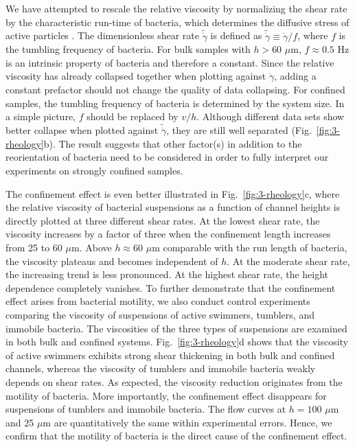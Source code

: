We have attempted to rescale the relative viscosity by normalizing the shear rate by the characteristic run-time of
bacteria, which determines the diffusive stress of active particles \cite{Takatori2017}. The dimensionless shear rate $\tilde{\dot\gamma}$ is defined as $\tilde{\dot\gamma}\equiv \dot\gamma / f$, where $f$ is the tumbling frequency of bacteria. For bulk samples with $h > 60$ $\mu$m, $f \approx 0.5$ Hz is an intrinsic property of bacteria and therefore a constant. Since the relative viscosity has already collapsed together when plotting against $\dot\gamma$, adding a constant prefactor should not change the quality of data collapsing. For confined samples, the tumbling frequency of bacteria is determined by the system size. In a simple picture, $f$ should be replaced by $v/h$. Although different data sets show better collapse when plotted against $\tilde{\dot\gamma}$, they are still well separated (Fig.~\ref{fig:3-rheology}b). The result suggests that other factor(s) in addition
to the reorientation of bacteria need to be considered in order to fully interpret our experiments on strongly confined samples.

The confinement effect is even better illustrated in Fig.~\ref{fig:3-rheology}c, where the relative viscosity of bacterial suspensions as a function of channel heights is directly plotted at three different shear rates. At the lowest shear rate, the viscosity increases by a factor of three when the confinement length increases from 25 to 60 $\mu$m. Above $h \approx 60$ $\mu$m comparable with the run length of bacteria, the viscosity plateaus and becomes
independent of $h$. At the moderate shear rate, the increasing trend is less pronounced. At the highest shear rate, the height dependence completely vanishes. To further demonstrate that the confinement effect arises from bacterial motility, we also conduct control experiments comparing the viscosity of suspensions of active swimmers, tumblers, and immobile bacteria. The viscosities of the three types of suspensions are examined in both bulk and confined systems. Fig.~\ref{fig:3-rheology}d shows that the viscosity of active swimmers exhibits strong shear thickening in both bulk and confined channels, whereas the viscosity of tumblers and immobile bacteria weakly depends on shear rates. As expected, the viscosity reduction originates from the motility of bacteria. More importantly, the confinement effect disappears for suspensions of tumblers and immobile bacteria. The flow curves at $h = 100$ $\mu$m and 25 $\mu$m are quantitatively the same within experimental errors. Hence, we confirm that the motility of bacteria is the direct cause of the confinement effect.

